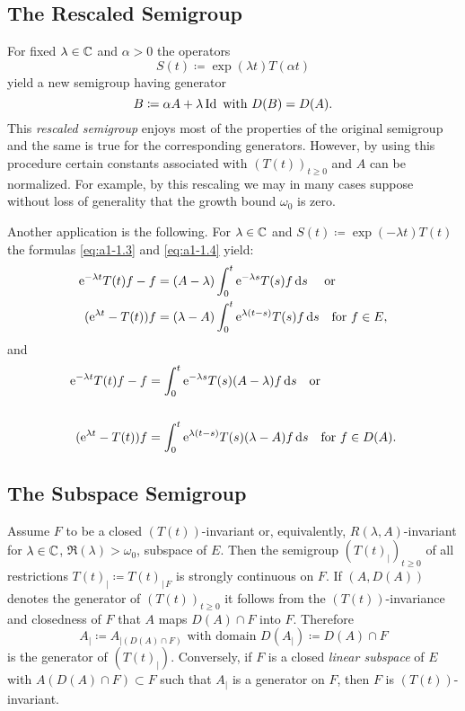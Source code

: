\subsection{The Rescaled Semigroup}\label{subsec:a1-3.2}%
For fixed $\lambda \in \mathbb{C}$ and $\alpha > 0$ the operators
\[
    S(t) \coloneqq \exp(\lambda t)T(\alpha t)
\]
yield a new semigroup having generator
\[
    B \coloneqq \alpha A + \lambda \operatorname{Id} \text{ with } D(B) = D(A) .
\]
This \emph{rescaled semigroup} enjoys most of the properties of the original semigroup and the same is true for the corresponding generators.
However, by using this procedure certain constants associated with $(T(t))_{t \geq 0}$ and $A$ can be normalized.
For example, by this rescaling we may in many cases suppose without loss of generality that the growth bound $\omega_{0}$ is zero.

Another application is the following.
For $\lambda \in \mathbb{C}$ and $S(t) \coloneqq \exp(-\lambda t)T(t)$ the formulas \eqref{eq:a1-1.3} and \eqref{eq:a1-1.4} yield:
\begin{align*}
     \mathrm{e}^{-\lambda t}T(t)f - f &= (A-\lambda) \int_{0}^{t}  \mathrm{e}^{-\lambda s}T(s)f \ds \quad\text{ or }\notag \\
    ( \mathrm{e}^{\lambda t}-T(t))f &= (\lambda-A) \int_{0}^{t}  \mathrm{e}^{\lambda(t-s)}T(s)f \ds \quad \text{for } f \in E, %
\end{align*}
and
\begin{align*}
     \mathrm{e}^{-\lambda t}T(t)f - f &= \int_{0}^{t}  \mathrm{e}^{-\lambda s}T(s)(A-\lambda)f \ds  \quad\text{or}\notag \\
    \notag \\
    ( \mathrm{e}^{\lambda t} - T(t))f &= \int_{0}^{t}  \mathrm{e}^{\lambda(t-s)}T(s)(\lambda-A)f \ds \quad \text{for } f \in D(A). %
\end{align*}
\subsection{The Subspace Semigroup}\label{subsec:a1-3.3}%
Assume $F$ to be a closed $(T(t))$-invariant or, equivalently, $R(\lambda,A)$-invariant for 
$\lambda \in \mathbb{C}$, 
$ \Re(\lambda) > \omega_{0}$, subspace of $E$.
Then the semigroup $(T(t)_{|})_{t \geq 0}$ of all restrictions $T(t)_{|} \coloneqq T(t)_{|\,F}$ is strongly continuous on $F$.
If $(A,D(A))$ denotes the generator of $(T(t))_{t \geq 0}$ it follows from the $(T(t))$-invariance and closedness of $F$ that $A$ maps $D(A) \cap F$ into $F$.
Therefore
\[
    A_{|} \coloneqq A_{| (D(A)\cap F)} \text{ with domain } D(A_{|}) \coloneqq D(A) \cap F
\]
is the generator of $(T(t)_{|})$.
%
Conversely, if $F$ is a closed \emph{linear subspace} of $E$ with $A(D(A) \cap F) \subset F$ such that 
$A_{|}$ is a generator on $F$, then $F$ is $(T(t))$-invariant.

